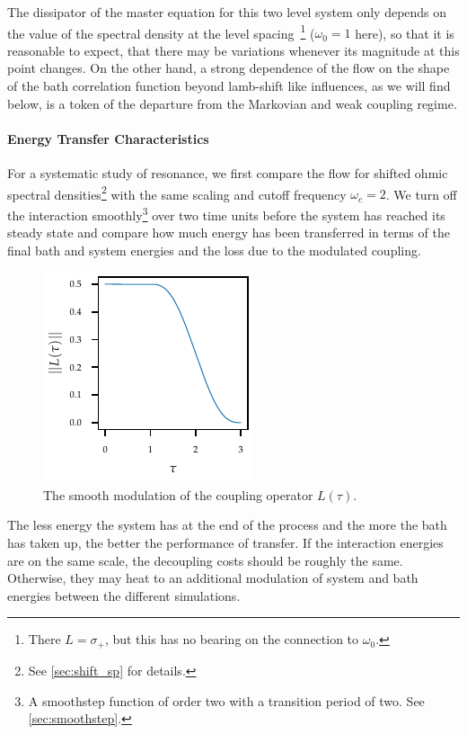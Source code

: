 The dissipator of the master equation for this two level system only
depends on the value of the spectral density at the level
spacing~\cite[p. 66]{Rivas2012}\footnote{There \(L=σ_{+}\), but this
  has no bearing on the connection to \(ω_{0}\).}  (\(ω_{0}=1\) here),
so that it is reasonable to expect, that there may be variations
whenever its magnitude at this point changes.  On the other hand, a
strong dependence of the flow on the shape of the bath correlation
function beyond lamb-shift like influences, as we will find below, is
a token of the departure from the Markovian and weak coupling
regime.

\paragraph{Energy Transfer Characteristics}
For a systematic study of resonance, we first compare the flow for
shifted ohmic spectral densities\footnote{See \cref{sec:shift_sp} for
  details.} with the same scaling and cutoff frequency \(ω_c=2\). We
turn off the interaction smoothly\footnote{A smoothstep function of
  order two with a transition period of two. See
  \cref{sec:smoothstep}.} over two time units before the system has
reached its steady state and compare how much energy has been
transferred in terms of the final bath and system energies and the
loss due to the modulated coupling.

\begin{figure}
  \centering
  \includegraphics{figs/one_bath_syst/L_mod}
  \caption{\label{fig:L_mod} The smooth modulation of the coupling
    operator \(L(τ)\).}
\end{figure}
The less energy the system has at the end of the process and
the more the bath has taken up, the better the performance of
transfer. If the interaction energies are on the same scale, the
decoupling costs should be roughly the same. Otherwise, they may heat
to an additional modulation of system and bath energies between the
different simulations.

